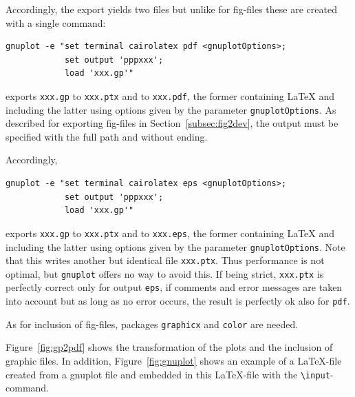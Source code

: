 \documentclass[12pt]{article}
\begin{document}
Accordingly, the export yields two files 
but unlike for fig-files these are created with a single command: 
%
\begin{verbatim}
gnuplot -e "set terminal cairolatex pdf <gnuplotOptions>;
            set output 'pppxxx';
            load 'xxx.gp'"
\end{verbatim}
%
exports {\tt xxx.gp} to {\tt xxx.ptx} and to {\tt xxx.pdf}, 
the former containing \LaTeX{} and including the latter 
using options given by the parameter {\tt gnuplotOptions}. 
As described for exporting fig-files in Section~\ref{subsec:fig2dev}, 
the output must be specified with the full path and without ending. 

Accordingly, 
%
\begin{verbatim}
gnuplot -e "set terminal cairolatex eps <gnuplotOptions>;
            set output 'pppxxx';
            load 'xxx.gp'"
\end{verbatim}
%
exports {\tt xxx.gp} to {\tt xxx.ptx} and to {\tt xxx.eps}, 
the former containing \LaTeX{} and including the latter 
using options given by the parameter {\tt gnuplotOptions}. 
Note that this writes another but identical file {\tt xxx.ptx}. 
Thus performance is not optimal, but {\tt gnuplot} offers no way to avoid this. 
If being strict, {\tt xxx.ptx} is perfectly correct only for output {\tt eps}, 
if comments and error messages are taken into account 
but as long as no error occurs, the result is perfectly ok also for {\tt pdf}. 

As for inclusion of fig-files, 
packages {\tt graphicx} and {\tt color} are needed. 



Figure~\ref{fig:gp2pdf} shows the transformation of the plots 
and the inclusion of graphic files. 
In addition, Figure~\ref{fig:gnuplot} shows an example of a \LaTeX-file 
created from a gnuplot file 
and embedded in this \LaTeX-file with the {\tt\textbackslash input}-command. 
\end{document}
